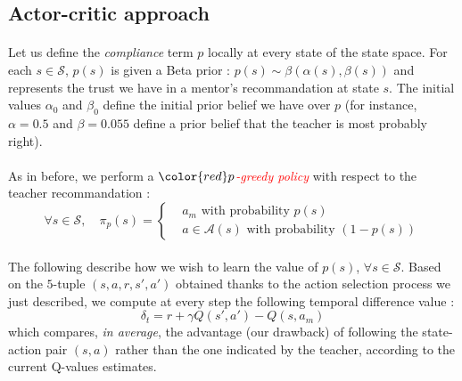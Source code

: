 \documentclass[a4paper]{report}
\begin{document}
{{{		\subsection{Actor-critic approach}
		{
			\paragraph{}  Let us define the \emph{compliance } term $p$ locally at every state of the state space. For each $s\in\mathcal{S}$, $p(s)$ is given a Beta prior : $p(s)\sim \beta(\alpha(s),\beta(s))$ and represents the trust we have in a mentor's recommandation at state $s$. The initial values $\alpha_0$ and $\beta_0$ define the initial prior belief we have over $p$ (for instance, $\alpha=0.5$ and $\beta = 0.055$ define a prior belief that the teacher is most probably right). 
			
			\paragraph{} As in before, we perform a $\color{red}p$\textcolor{red}{\emph{-greedy policy}} with respect to the teacher recommandation : 
			\begin{equation}
				\forall s\in\mathcal{S}, \quad \pi_p(s) = 
					\left\{ 
					\begin{aligned}
						&a_m \text{ with probability } p(s) \\
						& a\in\mathcal{A}(s) \text{ with probability } (1-p(s))
					\end{aligned}
					\right. 
			\end{equation}
		
			\paragraph{} The following describe how we wish to learn the value of $p(s)$, $\forall s\in\mathcal{S}$. Based on the $5$-tuple $(s,a,r,s',a')$ obtained thanks to the action selection process we just described, we compute at every step the following temporal difference value : 
			\begin{equation}
				\delta_t = r + \gamma Q(s',a') - Q(s,a_m)
			\end{equation}
			which compares, \emph{in average}, the advantage (our drawback) of following the state-action pair $(s,a)$ rather than the one indicated by the teacher, according to the current Q-values estimates. 
		
}}}}
\end{document}
